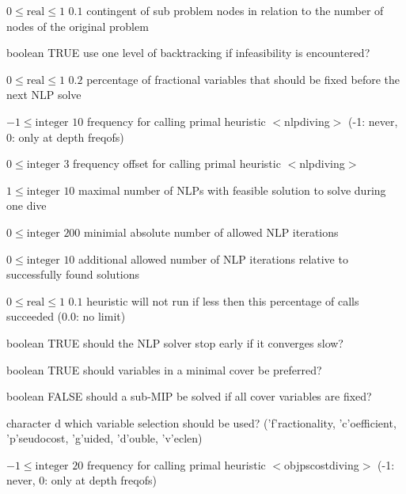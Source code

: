 %
{$0\leq\textrm{real}\leq1$}%
{$0.1$}%
{contingent of sub problem nodes in relation to the number of nodes of the original problem}%
{}

%
{boolean}%
{TRUE}%
{use one level of backtracking if infeasibility is encountered?}%
{}

%
{$0\leq\textrm{real}\leq1$}%
{$0.2$}%
{percentage of fractional variables that should be fixed before the next NLP solve}%
{}

%
{$-1\leq\textrm{integer}$}%
{$10$}%
{frequency for calling primal heuristic $<$nlpdiving$>$ (-1: never, 0: only at depth freqofs)}%
{}

%
{$0\leq\textrm{integer}$}%
{$3$}%
{frequency offset for calling primal heuristic $<$nlpdiving$>$}%
{}

%
{$1\leq\textrm{integer}$}%
{$10$}%
{maximal number of NLPs with feasible solution to solve during one dive}%
{}

%
{$0\leq\textrm{integer}$}%
{$200$}%
{minimial absolute number of allowed NLP iterations}%
{}

%
{$0\leq\textrm{integer}$}%
{$10$}%
{additional allowed number of NLP iterations relative to successfully found solutions}%
{}

%
{$0\leq\textrm{real}\leq1$}%
{$0.1$}%
{heuristic will not run if less then this percentage of calls succeeded (0.0: no limit)}%
{}

%
{boolean}%
{TRUE}%
{should the NLP solver stop early if it converges slow?}%
{}

%
{boolean}%
{TRUE}%
{should variables in a minimal cover be preferred?}%
{}

%
{boolean}%
{FALSE}%
{should a sub-MIP be solved if all cover variables are fixed?}%
{}

%
{character}%
{d}%
{which variable selection should be used? ('f'ractionality, 'c'oefficient, 'p'seudocost, 'g'uided, 'd'ouble, 'v'eclen)}%
{}

%
{$-1\leq\textrm{integer}$}%
{$20$}%
{frequency for calling primal heuristic $<$objpscostdiving$>$ (-1: never, 0: only at depth freqofs)}%
{}

